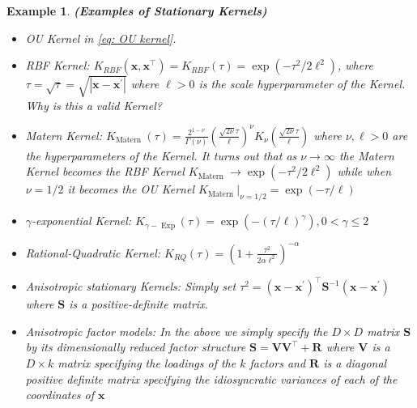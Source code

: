 \documentclass[11pt]{article}
\theoremstyle{plain} %
\newtheorem{example}[theorem]{Example}
\theoremstyle{remark}
\begin{document}
\begin{example} \textbf{(Examples of Stationary Kernels)}
  \begin{itemize}
    \item OU Kernel in \cref{eq: OU kernel}.

    \item RBF Kernel: $K_{R B F}\left(\mathbf{x}, \mathbf{x}^\top\right)=K_{R B
            F}(\tau)=\exp \left(-\tau^{2} / 2 \ell^{2}\right)$, where
          $\tau=\sqrt{\tau}=\sqrt{\left|\mathbf{x}-\mathbf{x}^{\prime}\right|}$ where
          $\ell>0$ is the scale hyperparameter of the Kernel. Why is this a valid
          Kernel?

    \item Matern Kernel: $K_{\text {Matern
                }}(\tau)=\frac{2^{1-\nu}}{\Gamma(\nu)}\left(\frac{\sqrt{2 \nu}
              \tau}{\ell}\right)^{\nu} K_{\nu}\left(\frac{\sqrt{2 \nu} \tau}{\ell}\right)$
          where $\nu, \ell>0$ are the hyperparameters of the Kernel. It turns out that
          as $\nu \rightarrow \infty$ the Matern Kernel becomes the RBF Kernel $K_{\text
                {Matern }} \rightarrow \exp \left(-\tau^{2} / 2 \ell^{2}\right)$ while when
          $\nu=1 / 2$ it becomes the OU Kernel $\left.K_{\text {Matern }}\right|_{\nu=1
            / 2}=\exp (-\tau / \ell)$

    \item $\gamma$-exponential Kernel: $K_{\gamma-\operatorname{Exp}}(\tau)=\exp
            \left(-(\tau / \ell)^{\gamma}\right), 0<\gamma \leq 2$

    \item Rational-Quadratic Kernel: $K_{R Q}(\tau)=\left(1+\frac{\tau^{2}}{2
              \alpha \ell^{2}}\right)^{-\alpha}$

    \item Anisotropic stationary Kernels: Simply set
          $\tau^{2}=\left(\mathbf{x}-\mathbf{x}^{\prime}\right)^\top
            \mathbf{S}^{-1}\left(\mathbf{x}-\mathbf{x}^{\prime}\right)$ where $\mathbf{S}$ is
          a positive-definite matrix.

    \item Anisotropic factor models: In the above we simply specify the $D \times
            D$ matrix $\mathbf{S}$ by its dimensionally reduced factor structure
          $\mathbf{S}=\mathbf{V} \mathbf{V}^\top+\mathbf{R}$ where $\mathbf{V}$ is a $D
            \times k$ matrix specifying the loadings of the $k$ factors and $\mathbf{R}$
          is a diagonal positive definite matrix specifying the idiosyncratic variances
          of each of the coordinates of $\mathbf{x}$
  \end{itemize}
\end{example}
\end{document}
